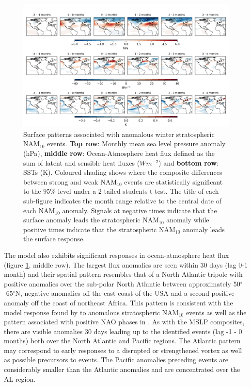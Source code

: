 \begin{center}
\begin{figure}[h!]
\noindent\includegraphics[width = \linewidth]{Figures/Figures-surface/in_season_response_NAM_combined.png}
\caption[Surface patterns associated with anomalous winter stratospheric NAM$_{10}$ events.]{Surface patterns associated with anomalous winter stratospheric NAM$_{10}$ events. \textbf{Top row}: Monthly mean sea level pressure anomaly (hPa), \textbf{middle row}: Ocean-Atmosphere heat flux defined as the sum of latent and sensible heat fluxes ($Wm^{-2}$) and \textbf{bottom row}: SSTs (K). Coloured shading shows where the composite differences between strong and weak NAM$_{10}$ events are statistically significant to the 95\% level under a 2 tailed students t-test. The title of each sub-figure indicates the month range relative to the central date of each NAM$_{10}$ anomaly. Signals at negative times indicate that the surface anomaly leads the stratospheric NAM$_{10}$ anomaly while positive times indicate that the stratospheric NAM$_{10}$ anomaly leads the surface response.}
\label{fig:surface_comp_all}
\end{figure}
\end{center}

The model also exhibits significant responses in ocean-atmosphere heat flux (figure \ref{fig:surface_comp_all}, middle row). The largest flux anomalies are seen within 30 days (lag 0-1 month) and their spatial pattern resembles that of a North Atlantic tripole with positive anomalies over the sub-polar North Atlantic between approximately 50$^\circ$-65$^\circ$N, negative anomalies off the east coast of the USA and a second positive anomaly off the coast of northeast Africa. This pattern is consistent with the model response found by \cite{reichlerStratospheric2012b} to anomalous stratospheric NAM$_{10}$ events as well as the pattern associated with positive NAO phases in \cite{delworthImpact2016c}. As with the MSLP composites, there are visible anomalies 30 days leading up to the identified events (lag -1 - 0 months) both over the North Atlantic and Pacific regions. The Atlantic pattern may correspond to early responses to a disrupted or strengthened vortex as well as possible precursors to events. The Pacific anomalies preceding events are considerably smaller than the Atlantic anomalies and are concentrated over the AL region.

